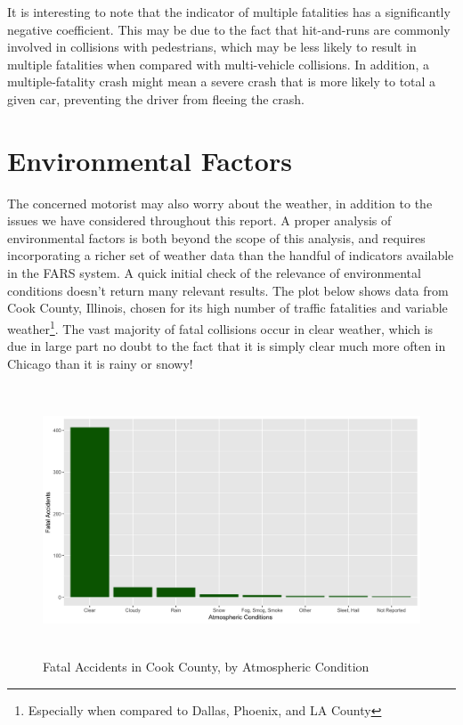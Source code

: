 \documentclass[11pt, oneside,titlepage]{article}   	%
\begin{document}
It is interesting to note that the indicator of multiple fatalities has a significantly negative coefficient. This may be due to the fact that hit-and-runs are commonly involved in collisions with pedestrians, which may be less likely to result in multiple fatalities when compared with multi-vehicle collisions. In addition, a multiple-fatality crash might mean a severe crash that is more likely to total a given car, preventing the driver from fleeing the crash.


\section*{Environmental Factors}
The concerned motorist may also worry about the weather, in addition to the issues we have considered throughout this report. A proper analysis of environmental factors is both beyond the scope of this analysis, and requires incorporating a richer set of weather data than the handful of indicators available in the FARS system. A quick initial check of the relevance of environmental conditions doesn't return many relevant results. The plot below shows data from Cook County, Illinois, chosen for its high number of traffic fatalities and variable weather\footnote{Especially when compared to Dallas, Phoenix, and LA County}. The vast majority of fatal collisions occur in clear weather, which is due in large part no doubt to the fact that it is simply clear much more often in Chicago than it is rainy or snowy! 

\begin{figure}[H]
\centering
  \includegraphics[width=15cm,height=8cm,keepaspectratio]{Environmental.png}
\caption{Fatal Accidents in Cook County, by Atmospheric Condition}
\end{figure}
\end{document}

